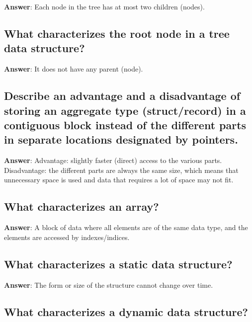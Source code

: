 \documentclass[a4paper,11pt,oneside]{article}
\begin{document}
\begin{sloppypar}
\label{q:270:sa:en:True}

\textbf{Answer}: Each node in the tree has at most two children (nodes).



\subsection{What characterizes the root node in a tree data structure?}

\label{q:271:sa:en:True}

\textbf{Answer}: It does not have any parent (node).



\subsection{Describe an advantage and a disadvantage of storing an aggregate type (struct/record) in a contiguous block instead of the different parts in separate locations designated by pointers.}

\label{q:272:sa:en:True}

\textbf{Answer}: Advantage: slightly faster (direct) access to the various parts. Disadvantage: the different parts are always the same size, which means that unnecessary space is used and data that requires a lot of space may not fit.



\subsection{What characterizes an array?}

\label{q:273:sa:en:True}

\textbf{Answer}: A block of data where all elements are of the same data type, and the elements are accessed by indexes/indices.



\subsection{What characterizes a static data structure?}

\label{q:274:sa:en:True}

\textbf{Answer}: The form or size of the structure cannot change over time.



\subsection{What characterizes a dynamic data structure?}


\end{sloppypar}
\end{document}

